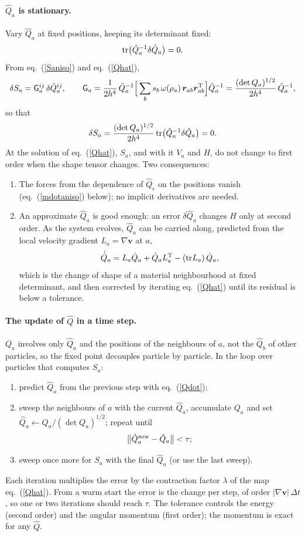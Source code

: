 \documentclass[11pt,aps,preprint,nofootinbib,superscriptaddress,tightenlines]{revtex4-2}
\def\st{\begin{equation}}
\def\stp{\end{equation}}
\def\Eq#1{eq.~(\ref{#1})}
\let\oldparagraph\paragraph
\renewcommand{\paragraph}{\par\bigskip\oldparagraph}
\begin{document}
\paragraph{$\hat Q_a$ is stationary.}  Vary $\hat Q_a$ at fixed positions, keeping its
determinant fixed:
\st
{\rm tr}\big(\hat Q_a^{-1}\delta\hat Q_a\big)=0 .
\label{detfix}
\stp
From \Eq{Saniso} and \Eq{Qhat},
\st
\delta S_a=\mathsf G_a^{ij}\,\delta\hat Q_a^{ij},\qquad
\mathsf G_a=\frac1{2h^4}\,\hat Q_a^{-1}\Big[\sum_bs_b\,\omega(\rho_a)\,\bm r_{ab}\bm r_{ab}^{\rm T}\Big]
\hat Q_a^{-1}=\frac{(\det Q_a)^{1/2}}{2h^4}\,\hat Q_a^{-1},
\label{Gc}
\stp
so that
\st
\delta S_a=\frac{(\det Q_a)^{1/2}}{2h^4}\,{\rm tr}\big(\hat Q_a^{-1}\delta\hat Q_a\big)=0 .
\stp
At the solution of \Eq{Qhat}, $S_a$, and with it $V_a$ and $H$, do not change to first order
when the shape tensor changes.  Two consequences:
\begin{enumerate}
\item The forces from the dependence of $\hat Q_c$ on the positions vanish (\Eq{mdotaniso}
  below); no implicit derivatives are needed.
\item An approximate $\hat Q_a$ is good enough: an error $\delta\hat Q_a$ changes $H$ only at
  second order.  As the system evolves, $\hat Q_a$ can be carried along, predicted from the
  local velocity gradient $L_a=\nabla\bm v$ at $a$,
  \st
  \dot{\hat Q}_a=L_a\hat Q_a+\hat Q_aL_a^{\rm T}-({\rm tr}L_a)\,\hat Q_a ,
  \label{Qdot}
  \stp
  which is the change of shape of a material neighbourhood at fixed determinant, and then
  corrected by iterating \Eq{Qhat} until its residual is below a tolerance.
\end{enumerate}

\paragraph{The update of $\hat Q$ in a time step.}  $Q_a$ involves only $\hat Q_a$ and the
positions of the neighbours of $a$, not the $\hat Q_b$ of other particles, so the fixed point
decouples particle by particle.  In the loop over particles that computes $S_a$:
\begin{enumerate}
\item predict $\hat Q_a$ from the previous step with \Eq{Qdot};
\item sweep the neighbours of $a$ with the current $\hat Q_a$, accumulate $Q_a$ and set
  $\hat Q_a\leftarrow Q_a/(\det Q_a)^{1/2}$; repeat until
  \st
  \big\|\hat Q_a^{\rm new}-\hat Q_a\big\|<\tau ;
  \stp
\item sweep once more for $S_a$ with the final $\hat Q_a$ (or use the last sweep).
\end{enumerate}
Each iteration multiplies the error by the contraction factor $\lambda$ of the map
\Eq{Qhat}.  From a warm start the error is the change per step, of order
$|\nabla\bm v|\,\Delta t$, so one or two iterations should reach $\tau$.  The tolerance
controls the energy (second order) and the angular momentum (first order); the momentum is
exact for any $\hat Q$.
\end{document}
